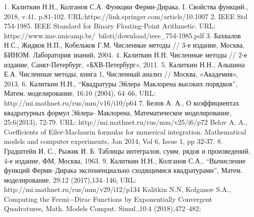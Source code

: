 1. Калиткин Н.Н., Колганов С.А. Функции Ферми-Дирака. I. Свойства
функций., 2018, v.41, p.81-102.
URL:https://link.springer.com/article/10.1007%
2. IEEE Std 754-1985. IEEE Standard for Binary Floating-Point Arithmetic.
URL: https://www.ime.unicamp.br/~biloti/download/ieee_754-1985.pdf
3. Бахвалов Н.С., Жидков Н.П., Кобельков Г.М. Численные методы // 3-е
издание, Москва, БИНОМ. Лаборатория знаний, 2004.
4. Калиткин Н.Н. Численные методы // 2-е издание, Санкт-Петербург,
«БХВ-Петербург», 2011.
5. Калиткин Н.Н., Альшина Е.А. Численные методы, книга 1, Численный
анализ // Москва, «Академия», 2013.
6. Калиткин Н.Н., “Квадратуры Эйлера–Маклорена высоких порядков”,
Матем. моделирование, 16:10 (2004), 64–66, URL:
http://mi.mathnet.ru/rus/mm/v16/i10/p64
7. Белов А. А., О коэффициентах квадратурных формул Эйлера-
Маклорена, Математическое моделирование, 25:6(2013), 72-79. URL:
http://mi.mathnet.ru/rus/mm/v25/i6/p72
Belov A. A., Coefficients of Eiler-Maclaurin formulas for numerical
integration. Mathematical models and computer experiments, Jan 2014, Vol 6, Issue
1, pp 32-37.
8. Градштейн И. С., Рыжик И. Б. Таблицы интегралов, сумм, рядов и
произведений. 4-е издание, ФМ, Москва, 1963.
9. Калиткин Н.Н., Колганов С.А., “Вычисление функций Ферми–Дирака
экспоненциально сходящимися квадратурами”, Матем. моделирование, 29:12
(2017),134–146; URL: http://mi.mathnet.ru/rus/mm/v29/i12/p134
Kalitkin N.N, Kolganov S.A., Computing the Fermi−Dirac Functions by
Exponentially Convergent Quadratures, Math. Models Comput. Simul.,10:4
(2018),472–482;

